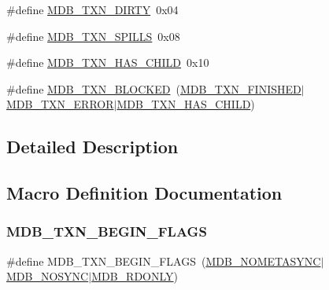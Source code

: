 \begin{DoxyCompactItemize}
\#define \mbox{\hyperlink{group__mdb__txn_gad73fa9622bdf80a7b4ebf8c739eb2c03}{M\+D\+B\+\_\+\+T\+X\+N\+\_\+\+D\+I\+R\+TY}}~0x04
\item 
\#define \mbox{\hyperlink{group__mdb__txn_ga886a44ffd1ee13b786f4c3cc8b60e18a}{M\+D\+B\+\_\+\+T\+X\+N\+\_\+\+S\+P\+I\+L\+LS}}~0x08
\item 
\#define \mbox{\hyperlink{group__mdb__txn_gae22c21354cea3cf2bddba79348c8f5b8}{M\+D\+B\+\_\+\+T\+X\+N\+\_\+\+H\+A\+S\+\_\+\+C\+H\+I\+LD}}~0x10
\item 
\#define \mbox{\hyperlink{group__mdb__txn_gadd3e56a5a13680cccfd83a1fef4cf1bc}{M\+D\+B\+\_\+\+T\+X\+N\+\_\+\+B\+L\+O\+C\+K\+ED}}~(\mbox{\hyperlink{group__mdb__txn_gabef55eae8d32bc3d6fafff8495bfc4a0}{M\+D\+B\+\_\+\+T\+X\+N\+\_\+\+F\+I\+N\+I\+S\+H\+ED}}$\vert$\mbox{\hyperlink{group__mdb__txn_gadf70c805448c5b852647f5fdf7233a7d}{M\+D\+B\+\_\+\+T\+X\+N\+\_\+\+E\+R\+R\+OR}}$\vert$\mbox{\hyperlink{group__mdb__txn_gae22c21354cea3cf2bddba79348c8f5b8}{M\+D\+B\+\_\+\+T\+X\+N\+\_\+\+H\+A\+S\+\_\+\+C\+H\+I\+LD}})
\end{DoxyCompactItemize}


\subsection{Detailed Description}


\subsection{Macro Definition Documentation}
\mbox{\label{group__mdb__txn_gad9afcb51edcbf5ad5d69c2005e944d46}} 
\subsubsection{\texorpdfstring{M\+D\+B\+\_\+\+T\+X\+N\+\_\+\+B\+E\+G\+I\+N\+\_\+\+F\+L\+A\+GS}{MDB\_TXN\_BEGIN\_FLAGS}}
{\footnotesize\ttfamily \#define M\+D\+B\+\_\+\+T\+X\+N\+\_\+\+B\+E\+G\+I\+N\+\_\+\+F\+L\+A\+GS~(\mbox{\hyperlink{group__mdb__env_ga5021c4e96ffe9f383f5b8ab2af8e4b16}{M\+D\+B\+\_\+\+N\+O\+M\+E\+T\+A\+S\+Y\+NC}}$\vert$\mbox{\hyperlink{group__mdb__env_ga5791dd1adb09123f82dd1f331209e12e}{M\+D\+B\+\_\+\+N\+O\+S\+Y\+NC}}$\vert$\mbox{\hyperlink{group__mdb__env_gac4c41c0ae044127b2fc80420c323cac6}{M\+D\+B\+\_\+\+R\+D\+O\+N\+LY}})}


